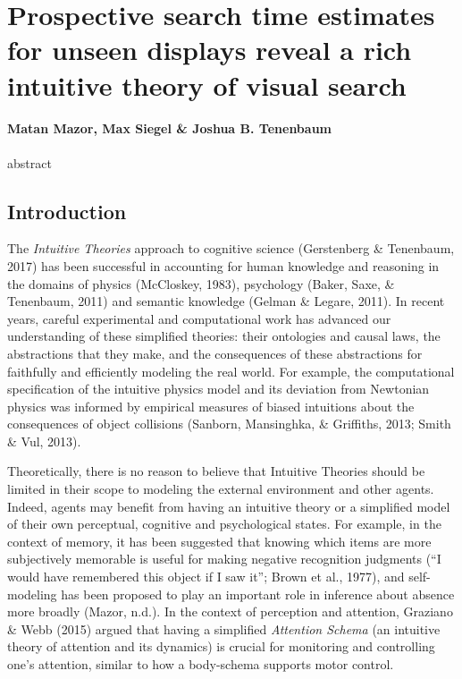 \documentclass[12pt,twoside]{reedthesis}
\begin{document}
\hypertarget{ch:MVS}{%
\chapter{Prospective search time estimates for unseen displays reveal a rich intuitive theory of visual search}\label{ch:MVS}}

\hypertarget{matan-mazor-max-siegel-joshua-b.-tenenbaum}{%
\subsubsection*{Matan Mazor, Max Siegel \& Joshua B. Tenenbaum}\label{matan-mazor-max-siegel-joshua-b.-tenenbaum}}

abstract

\hypertarget{introduction-2}{%
\section{Introduction}\label{introduction-2}}

The \emph{Intuitive Theories} approach to cognitive science (Gerstenberg \& Tenenbaum, 2017) has been successful in accounting for human knowledge and reasoning in the domains of physics (McCloskey, 1983), psychology (Baker, Saxe, \& Tenenbaum, 2011) and semantic knowledge (Gelman \& Legare, 2011). In recent years, careful experimental and computational work has advanced our understanding of these simplified theories: their ontologies and causal laws, the abstractions that they make, and the consequences of these abstractions for faithfully and efficiently modeling the real world. For example, the computational specification of the intuitive physics model and its deviation from Newtonian physics was informed by empirical measures of biased intuitions about the consequences of object collisions (Sanborn, Mansinghka, \& Griffiths, 2013; Smith \& Vul, 2013).

Theoretically, there is no reason to believe that Intuitive Theories should be limited in their scope to modeling the external environment and other agents. Indeed, agents may benefit from having an intuitive theory or a simplified model of their own perceptual, cognitive and psychological states. For example, in the context of memory, it has been suggested that knowing which items are more subjectively memorable is useful for making negative recognition judgments (``I would have remembered this object if I saw it''; Brown et al., 1977), and self-modeling has been proposed to play an important role in inference about absence more broadly (Mazor, n.d.). In the context of perception and attention, Graziano \& Webb (2015) argued that having a simplified \emph{Attention Schema} (an intuitive theory of attention and its dynamics) is crucial for monitoring and controlling one's attention, similar to how a body-schema supports motor control.
\end{document}
